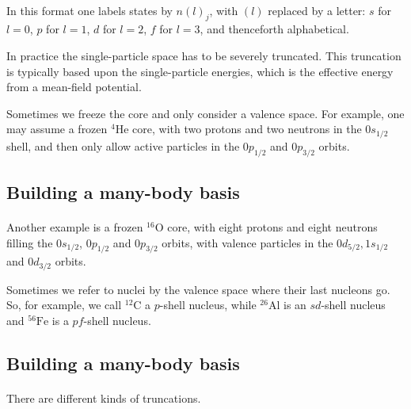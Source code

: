 \documentclass[%
twoside,                 %
final,                   %
10pt]{article}
\begin{document}
\paragraph{}
In this format one labels states by $n(l)_j$, with $(l)$ replaced by a letter:
$s$ for $l=0$, $p$ for $l=1$, $d$ for $l=2$, $f$ for $l=3$, and thenceforth alphabetical.


 In practice the single-particle space has to be severely truncated.  This truncation is 
typically based upon the single-particle energies, which is the effective energy 
from a mean-field potential. 

Sometimes we freeze the core and only consider a valence space. For example, one 
may assume a frozen ${}^{4}\mbox{He}$ core, with two protons and two neutrons in the $0s_{1/2}$ 
shell, and then only allow active particles in the $0p_{1/2}$ and $0p_{3/2}$ orbits.



\subsection{Building a many-body basis}

\paragraph{}

Another example is a frozen ${}^{16}\mbox{O}$ core, with eight protons and eight neutrons filling the 
$0s_{1/2}$,  $0p_{1/2}$ and $0p_{3/2}$ orbits, with valence particles in the 
$0d_{5/2}, 1s_{1/2}$ and $0d_{3/2}$ orbits.


Sometimes we refer to nuclei by the valence space where their last nucleons go.  
So, for example, we call ${}^{12}\mbox{C}$ a $p$-shell nucleus, while ${}^{26}\mbox{Al}$ is an 
$sd$-shell nucleus and ${}^{56}\mbox{Fe}$ is a $pf$-shell nucleus.





\subsection{Building a many-body basis}

\paragraph{}
There are different kinds of truncations.
\end{document}
